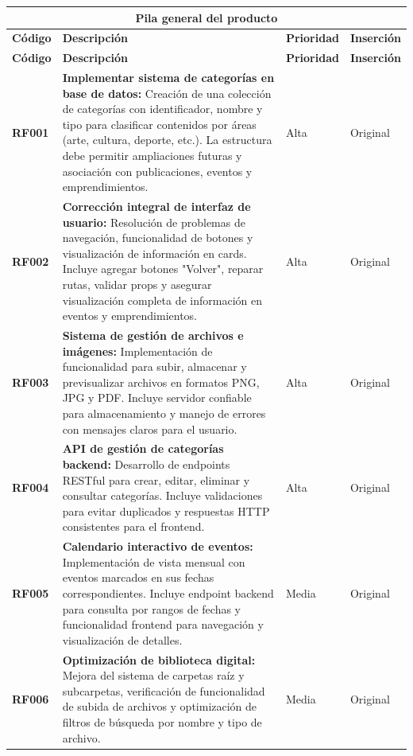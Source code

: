\begin{longtable}{|l||p{7cm}|l|l|}
\multicolumn{4}{c}{Pila general del producto}\\
\hline\hline
\textbf{Código} & \textbf{Descripción} & \textbf{Prioridad} & \textbf{Inserción}\\
\hline
\endfirsthead
\textbf{Código} & \textbf{Descripción} & \textbf{Prioridad} & \textbf{Inserción}\\
\hline\hline
\endhead

\textbf{RF001} & 
\textbf{Implementar sistema de categorías en base de datos:} Creación de una colección de categorías con identificador, nombre y tipo para clasificar contenidos por áreas (arte, cultura, deporte, etc.). La estructura debe permitir ampliaciones futuras y asociación con publicaciones, eventos y emprendimientos. & Alta & Original \\

\textbf{RF002} & 
\textbf{Corrección integral de interfaz de usuario:} Resolución de problemas de navegación, funcionalidad de botones y visualización de información en cards. Incluye agregar botones "Volver", reparar rutas, validar props y asegurar visualización completa de información en eventos y emprendimientos. & Alta & Original \\

\textbf{RF003} & 
\textbf{Sistema de gestión de archivos e imágenes:} Implementación de funcionalidad para subir, almacenar y previsualizar archivos en formatos PNG, JPG y PDF. Incluye servidor confiable para almacenamiento y manejo de errores con mensajes claros para el usuario. & Alta & Original \\

\textbf{RF004} & 
\textbf{API de gestión de categorías backend:} Desarrollo de endpoints RESTful para crear, editar, eliminar y consultar categorías. Incluye validaciones para evitar duplicados y respuestas HTTP consistentes para el frontend. & Alta & Original \\

\textbf{RF005} & 
\textbf{Calendario interactivo de eventos:} Implementación de vista mensual con eventos marcados en sus fechas correspondientes. Incluye endpoint backend para consulta por rangos de fechas y funcionalidad frontend para navegación y visualización de detalles. & Media & Original \\

\textbf{RF006} & 
\textbf{Optimización de biblioteca digital:} Mejora del sistema de carpetas raíz y subcarpetas, verificación de funcionalidad de subida de archivos y optimización de filtros de búsqueda por nombre y tipo de archivo. & Media & Original \\


\end{longtable}
